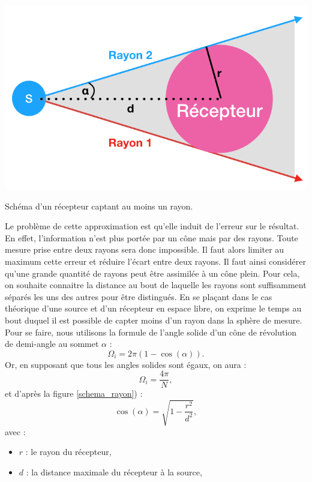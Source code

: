 %
\begin{figureth}
	\includegraphics[width=0.7\linewidth]{images/schema_rayon}
	\caption{Schéma d'un récepteur captant au moins un rayon.}
	\label{schema_rayon}
\end{figureth}
%
 Le problème de cette approximation est qu'elle induit de l'erreur sur le résultat. En effet, l'information n'est plus portée par un cône mais par des rayons. Toute mesure prise entre deux rayons sera donc impossible. Il faut alors limiter au maximum cette erreur et réduire l'écart entre deux rayons. Il faut ainsi considérer qu'une grande quantité de rayons peut être assimilée à un cône plein. Pour cela, on souhaite connaitre la distance au bout de laquelle les rayons sont suffisamment séparés les uns des autres pour être distingués. En se plaçant dans le cas théorique d'une source et d'un récepteur en espace libre, on exprime le temps au bout duquel il est possible de capter moins d'un rayon dans la sphère de mesure. Pour se faire, nous utilisons la formule de l'angle solide d'un cône de révolution \cite[Angle solide d'un cône de révolution]{cone} de demi-angle au sommet $\alpha$ :
\begin{equation}
	\Omega_i = 2\pi(1-\cos(\alpha)).
\end{equation}
%
Or, en supposant que tous les angles solides sont égaux, on aura :
\begin{equation}
	\Omega_i = \frac{4\pi}{N},
\end{equation}
%
et d'après la figure \ref{schema_rayon}) :
\begin{equation*}
	\cos(\alpha)  =  \sqrt{1-\frac{r^2}{d^2}},
\end{equation*}
avec  :
\begin{itemize}
\item $r$ : le rayon du récepteur,
\item $d$ : la distance maximale du récepteur à la source,
\end{itemize}
